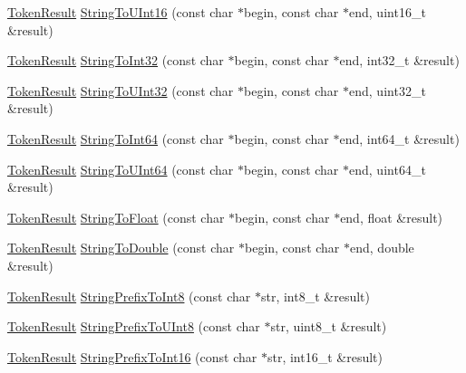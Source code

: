 \begin{DoxyCompactItemize}
\hyperlink{namespacemage_a2178ba2411db5912f41b2e7698c2037d}{Token\+Result} \hyperlink{namespacemage_a12bd34f17d7d39ac8d054be9293efe54}{String\+To\+U\+Int16} (const char $\ast$begin, const char $\ast$end, uint16\+\_\+t \&result)
\item 
\hyperlink{namespacemage_a2178ba2411db5912f41b2e7698c2037d}{Token\+Result} \hyperlink{namespacemage_a011b7977a7ae88795aac61e0e921bffe}{String\+To\+Int32} (const char $\ast$begin, const char $\ast$end, int32\+\_\+t \&result)
\item 
\hyperlink{namespacemage_a2178ba2411db5912f41b2e7698c2037d}{Token\+Result} \hyperlink{namespacemage_ad84d36f8aaa4376d26b79a2fbd8fe22a}{String\+To\+U\+Int32} (const char $\ast$begin, const char $\ast$end, uint32\+\_\+t \&result)
\item 
\hyperlink{namespacemage_a2178ba2411db5912f41b2e7698c2037d}{Token\+Result} \hyperlink{namespacemage_a1e044f5c734c6597945b775100c45086}{String\+To\+Int64} (const char $\ast$begin, const char $\ast$end, int64\+\_\+t \&result)
\item 
\hyperlink{namespacemage_a2178ba2411db5912f41b2e7698c2037d}{Token\+Result} \hyperlink{namespacemage_a8e3b6a19a6ab9e7c905150352b8ab0ea}{String\+To\+U\+Int64} (const char $\ast$begin, const char $\ast$end, uint64\+\_\+t \&result)
\item 
\hyperlink{namespacemage_a2178ba2411db5912f41b2e7698c2037d}{Token\+Result} \hyperlink{namespacemage_a8610747ad641d27135bcd3a3d3c6b6c2}{String\+To\+Float} (const char $\ast$begin, const char $\ast$end, float \&result)
\item 
\hyperlink{namespacemage_a2178ba2411db5912f41b2e7698c2037d}{Token\+Result} \hyperlink{namespacemage_aaee12fa175aece0a6ffbaa8df4e63b60}{String\+To\+Double} (const char $\ast$begin, const char $\ast$end, double \&result)
\item 
\hyperlink{namespacemage_a2178ba2411db5912f41b2e7698c2037d}{Token\+Result} \hyperlink{namespacemage_ab2a4f965199e2efba23cbbd052a66283}{String\+Prefix\+To\+Int8} (const char $\ast$str, int8\+\_\+t \&result)
\item 
\hyperlink{namespacemage_a2178ba2411db5912f41b2e7698c2037d}{Token\+Result} \hyperlink{namespacemage_ace3c30c1b0e1eddafc8f14335223c46b}{String\+Prefix\+To\+U\+Int8} (const char $\ast$str, uint8\+\_\+t \&result)
\item 
\hyperlink{namespacemage_a2178ba2411db5912f41b2e7698c2037d}{Token\+Result} \hyperlink{namespacemage_a8ad9257753f5f5288f8e09b2c99e544e}{String\+Prefix\+To\+Int16} (const char $\ast$str, int16\+\_\+t \&result)

\end{DoxyCompactItemize}
